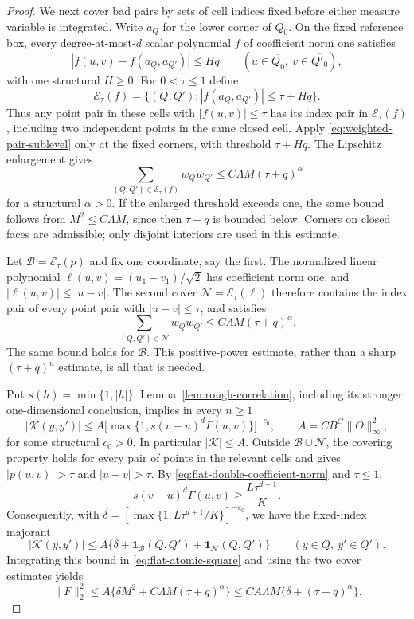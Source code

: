 \documentclass[11pt]{article}
\numberwithin{equation}{section}
\theoremstyle{remark}
\theoremstyle{definition}
\newcommand{\norm}[1]{\lVert #1\rVert}
\begin{document}
\begin{proof}
We next cover bad pairs by sets of cell indices fixed before either
measure variable is integrated.  Write $a_Q$ for the lower corner of
$Q_0$.  On the fixed reference box, every degree-at-most-$d$ scalar
polynomial $f$ of coefficient norm one satisfies
\[
 |f(u,v)-f(a_Q,a_{Q'})|\le Hq
 \qquad(u\in\overline{Q_0},\ v\in\overline{Q'_0}),
\]
with one structural $H\ge0$.  For $0<\tau\le1$ define
\[
 \mathcal E_\tau(f)
 =\{(Q,Q'):|f(a_Q,a_{Q'})|\le\tau+Hq\}.
\]
Thus any point pair in these cells with $|f(u,v)|\le\tau$ has its
index pair in $\mathcal E_\tau(f)$, including two independent points
in the same closed cell.  Apply
\eqref{eq:weighted-pair-sublevel} only at the fixed corners, with
threshold $\tau+Hq$.  The Lipschitz enlargement gives
\[
 \sum_{(Q,Q')\in\mathcal E_\tau(f)}w_Qw_{Q'}
 \le C\Lambda M(\tau+q)^\alpha
\]
for a structural $\alpha>0$.  If the enlarged threshold exceeds one,
the same bound follows from $M^2\le C\Lambda M$, since then
$\tau+q$ is bounded below.  Corners on closed faces are admissible;
only disjoint interiors are used in this estimate.

Let $\mathcal B=\mathcal E_\tau(p)$ and fix one coordinate, say the
first.  The normalized linear polynomial
$\ell(u,v)=(u_1-v_1)/\sqrt2$ has coefficient norm one, and
$|\ell(u,v)|\le|u-v|$.  The second cover
$\mathcal N=\mathcal E_\tau(\ell)$ therefore contains the index pair
of every point pair with $|u-v|\le\tau$, and satisfies
\begin{equation}\label{eq:flat-near-pairs}
 \sum_{(Q,Q')\in\mathcal N}w_Qw_{Q'}
 \le C\Lambda M(\tau+q)^\alpha.
\end{equation}
The same bound holds for $\mathcal B$.  This positive-power estimate,
rather than a sharp $(\tau+q)^n$ estimate, is all that is needed.

Put $s(h)=\min\{1,|h|\}$.  Lemma~\ref{lem:rough-correlation}, including
its stronger one-dimensional conclusion, implies in every $n\ge1$
\[
 |\mathcal K(y,y')|
 \le A\bigl[\max\{1,s(v-u)^d\Gamma(u,v)\}\bigr]^{-c_0},
 \qquad A=CB^C\norm\Theta_\infty^2,
\]
for some structural $c_0>0$.  In particular $|\mathcal K|\le A$.
Outside $\mathcal B\cup\mathcal N$, the covering property holds for
every pair of points in the relevant cells and gives
$|p(u,v)|>\tau$ and $|u-v|>\tau$.  By
\eqref{eq:flat-double-coefficient-norm} and $\tau\le1$,
\[
 s(v-u)^d\Gamma(u,v)\ge\frac{L\tau^{d+1}}K.
\]
Consequently, with
$\delta=[\max\{1,L\tau^{d+1}/K\}]^{-c_0}$, we have the fixed-index
majorant
\[
 |\mathcal K(y,y')|\le
 A\{\delta+\mathbf1_{\mathcal B}(Q,Q')+
                  \mathbf1_{\mathcal N}(Q,Q')\}
 \qquad(y\in Q,\ y'\in Q').
\]
Integrating this bound in \eqref{eq:flat-atomic-square} and using the
two cover estimates yields
\[
 \norm F_2^2\le A\{\delta M^2+C\Lambda M(\tau+q)^\alpha\}
 \le CA\Lambda M\{\delta+(\tau+q)^\alpha\}.
\]


\end{proof}
\end{document}
